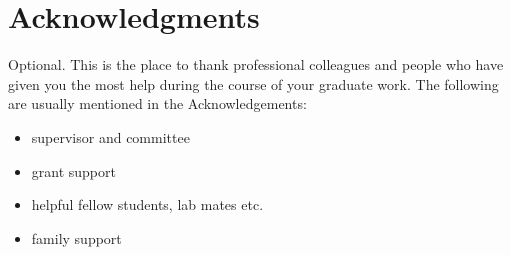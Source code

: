 
\chapter{Acknowledgments}

Optional. This is the place to thank professional colleagues and people who
have given you the most help during the course of your graduate work. The
following are usually mentioned in the Acknowledgements:
\begin{itemize}
\item supervisor and committee
\item grant support
\item helpful fellow students, lab mates etc.
\item family support
\end{itemize}
